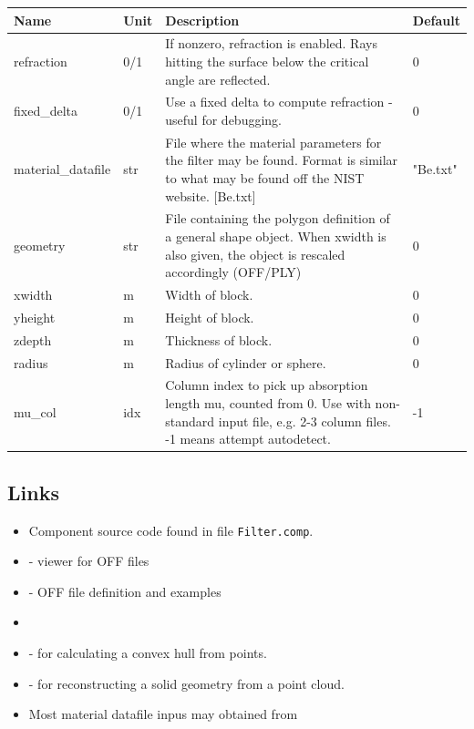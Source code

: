 \begin{longtable}{p{}p{}p{}p{}}
\toprule
\textbf{Name} & \textbf{Unit} & \textbf{Description} & \textbf{Default} \\
\midrule
\endhead
refraction & 0/1 & If nonzero, refraction is enabled. Rays hitting the surface below the critical angle are reflected. & 0 \\
fixed\_delta & 0/1 & Use a fixed delta to compute refraction - useful for debugging. & 0 \\
material\_datafile & str & File where the material parameters for the filter may be found. Format is similar to what may be found off the NIST website. [Be.txt] & "Be.txt" \\
geometry & str & File containing the polygon definition of a general shape object. When xwidth is also given, the object is rescaled accordingly (OFF/PLY) & 0 \\
xwidth & m & Width of block. & 0 \\
yheight & m & Height of block. & 0 \\
zdepth & m & Thickness of block. & 0 \\
radius & m & Radius of cylinder or sphere. & 0 \\
mu\_col & idx & Column index to pick up absorption length mu, counted from 0. Use with non-standard input file, e.g. 2-3 column files. -1 means attempt autodetect. & -1 \\
\bottomrule
\end{longtable}

\subsection*{Links}
\begin{itemize}
  \item Component source code found in file \texttt{Filter.comp}.
  \item {} - viewer for OFF files
  \item {} - OFF file definition and examples
  \item {}
  \item {} - for calculating a convex hull from points.
  \item {} - for reconstructing a solid geometry from a point cloud.
  \item Most material datafile inpus may obtained from 
\end{itemize}
